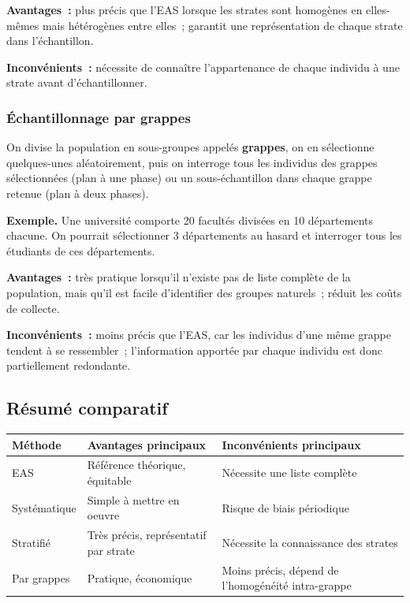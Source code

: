 \documentclass[11pt,french]{article}
\begin{document}
\textbf{Avantages~:} plus précis que l'EAS lorsque les strates sont homogènes en elles-mêmes
mais hétérogènes entre elles~; garantit une représentation de chaque strate dans l'échantillon.

\textbf{Inconvénients~:} nécessite de connaître l'appartenance de chaque individu à une strate
avant d'échantillonner.

\subsubsection{Échantillonnage par grappes}

On divise la population en sous-groupes appelés \textbf{grappes}, on en sélectionne quelques-unes
aléatoirement, puis on interroge tous les individus des grappes sélectionnées (plan à une phase)
ou un sous-échantillon dans chaque grappe retenue (plan à deux phases).

\textbf{Exemple.} Une université comporte 20 facultés divisées en 10 départements chacune.
On pourrait sélectionner 3 départements au hasard et interroger tous les étudiants de ces
départements.

\textbf{Avantages~:} très pratique lorsqu'il n'existe pas de liste complète de la population,
mais qu'il est facile d'identifier des groupes naturels~; réduit les coûts de collecte.

\textbf{Inconvénients~:} moins précis que l'EAS, car les individus d'une même grappe tendent
à se ressembler~; l'information apportée par chaque individu est donc partiellement redondante.

\subsection{Résumé comparatif}

\begin{center}
\renewcommand{\arraystretch}{1.4}
\begin{tabular}{p{3.5cm}p{5.2cm}p{5.2cm}}
\toprule
\textbf{Méthode} & \textbf{Avantages principaux} & \textbf{Inconvénients principaux} \\
\midrule
EAS & Référence théorique, équitable & Nécessite une liste complète \\
Systématique & Simple à mettre en oeuvre & Risque de biais périodique \\
Stratifié & Très précis, représentatif par strate & Nécessite la connaissance des strates \\
Par grappes & Pratique, économique & Moins précis, dépend de l'homogénéité intra-grappe \\
\bottomrule
\end{tabular}
\end{center}
\end{document}

